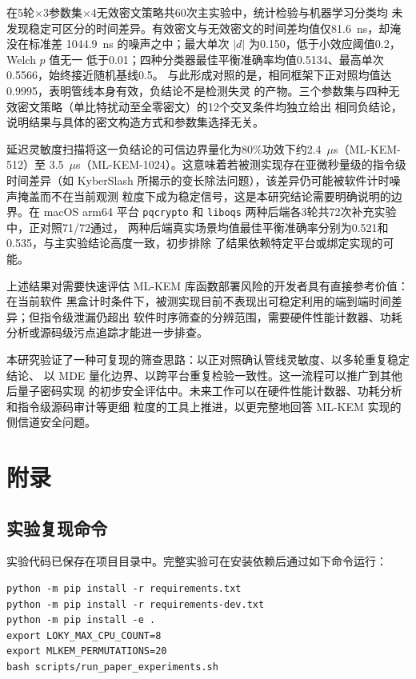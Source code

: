 \documentclass[a4paper,fontset=none]{ctexart}
\begin{document}
在5轮$\times$3参数集$\times$4无效密文策略共60次主实验中，统计检验与机器学习分类均
未发现稳定可区分的时间差异。有效密文与无效密文的时间差均值仅81.6~ns，却淹没在标准差
1044.9~ns 的噪声之中；最大单次 $|d|$ 为0.150，低于小效应阈值0.2，Welch $p$ 值无一
低于0.01；四种分类器最佳平衡准确率均值0.5134、最高单次0.5566，始终接近随机基线0.5。
与此形成对照的是，相同框架下正对照均值达0.9995，表明管线本身有效，负结论不是检测失灵
的产物。三个参数集与四种无效密文策略（单比特扰动至全零密文）的12个交叉条件均独立给出
相同负结论，说明结果与具体的密文构造方式和参数集选择无关。

延迟灵敏度扫描将这一负结论的可信边界量化为80\%功效下约2.4~$\mu$s（ML-KEM-512）至
3.5~$\mu$s（ML-KEM-1024）。这意味着若被测实现存在亚微秒量级的指令级时间差异（如
KyberSlash 所揭示的变长除法问题），该差异仍可能被软件计时噪声掩盖而不在当前观测
粒度下成为稳定信号，这是本研究结论需要明确说明的边界。在 macOS arm64 平台
\texttt{pqcrypto} 和 \texttt{liboqs} 两种后端各3轮共72次补充实验中，正对照71/72通过，
两种后端真实场景均值最佳平衡准确率分别为0.521和0.535，与主实验结论高度一致，初步排除
了结果依赖特定平台或绑定实现的可能。

上述结果对需要快速评估 ML-KEM 库函数部署风险的开发者具有直接参考价值：在当前软件
黑盒计时条件下，被测实现目前不表现出可稳定利用的端到端时间差异；但指令级泄漏仍超出
软件时序筛查的分辨范围，需要硬件性能计数器、功耗分析或源码级污点追踪才能进一步排查。

本研究验证了一种可复现的筛查思路：以正对照确认管线灵敏度、以多轮重复稳定结论、
以 MDE 量化边界、以跨平台重复检验一致性。这一流程可以推广到其他后量子密码实现
的初步安全评估中。未来工作可以在硬件性能计数器、功耗分析和指令级源码审计等更细
粒度的工具上推进，以更完整地回答 ML-KEM 实现的侧信道安全问题。

\clearpage
{}
\printbibliography[heading=bibintoc,title={参考文献}]

\clearpage
\appendix
{}
{}

\section*{附录}

\subsection*{实验复现命令}

实验代码已保存在项目目录中。完整实验可在安装依赖后通过如下命令运行：

\begin{verbatim}
python -m pip install -r requirements.txt
python -m pip install -r requirements-dev.txt
python -m pip install -e .
export LOKY_MAX_CPU_COUNT=8
export MLKEM_PERMUTATIONS=20
bash scripts/run_paper_experiments.sh
\end{verbatim}
\end{document}
